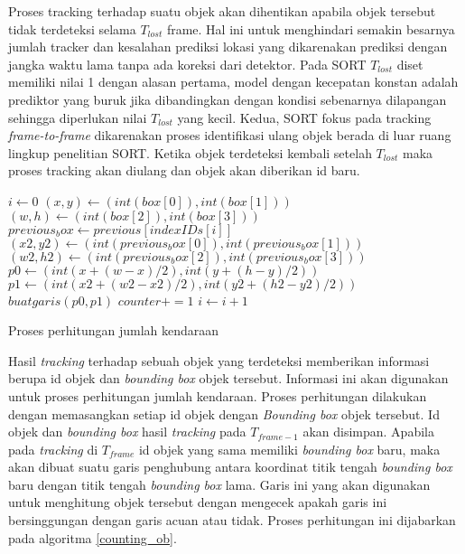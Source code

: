 \documentclass[../thesis.tex]{subfiles}
\begin{document}
Proses tracking terhadap suatu objek akan dihentikan apabila objek tersebut tidak terdeteksi selama $T_{lost}$ frame. Hal ini untuk menghindari semakin besarnya jumlah tracker dan kesalahan prediksi lokasi yang dikarenakan prediksi dengan jangka waktu lama tanpa ada koreksi dari detektor. Pada SORT $T_{lost}$ diset memiliki nilai 1 dengan alasan pertama, model dengan kecepatan konstan adalah prediktor yang buruk jika dibandingkan dengan kondisi sebenarnya dilapangan sehingga diperlukan nilai $T_{lost}$ yang kecil. Kedua, SORT fokus pada tracking \textit{frame-to-frame} dikarenakan proses identifikasi ulang objek berada 
di luar ruang lingkup penelitian SORT. Ketika objek terdeteksi kembali setelah $T_{lost}$ maka proses tracking akan diulang dan objek akan diberikan id baru.
\begin{algorithm}[htp]
	\begin{algorithmic}[1]
			\State $i \leftarrow 0$
				\State $(x, y) \leftarrow (int(box[0]), int(box[1]))$
				\State $(w, h) \leftarrow (int(box[2]), int(box[3]))$
					\State $previous_box \leftarrow previous[indexIDs[i]]$
					\State $(x2, y2) \leftarrow (int(previous_box[0]), int(previous_box[1]))$
					\State $(w2, h2) \leftarrow (int(previous_box[2]), int(previous_box[3]))$
					\State $p0 \leftarrow (int(x + (w-x)/2), int(y + (h-y)/2))$
					\State $p1 \leftarrow (int(x2 + (w2-x2)/2), int(y2 + (h2-y2)/2))$
					\State $buat garis (p0, p1)$
						\State $counter += 1$
					\EndIf
				\EndIf
				\State $i \leftarrow i+1$
			\EndFor
		\EndIf
	\end{algorithmic}
	\caption{Proses perhitungan jumlah kendaraan}
	\label{counting_ob}
\end{algorithm}

Hasil \textit{tracking} terhadap sebuah objek yang terdeteksi memberikan informasi berupa id objek dan \textit{bounding box} objek tersebut. Informasi ini akan digunakan untuk proses perhitungan jumlah kendaraan. Proses perhitungan dilakukan dengan memasangkan setiap id objek dengan \textit{Bounding box} objek tersebut. 
Id objek dan \textit{bounding box} hasil \textit{tracking} pada $T_{frame-1}$ akan disimpan. Apabila pada \textit{tracking} di $T_{frame}$ id objek yang sama memiliki \textit{bounding box} baru, maka akan dibuat suatu garis penghubung antara koordinat titik tengah \textit{bounding box} baru dengan titik tengah \textit{bounding box} lama. Garis ini
yang akan digunakan untuk menghitung objek tersebut dengan mengecek apakah garis ini bersinggungan dengan garis acuan atau tidak. Proses perhitungan ini dijabarkan pada algoritma \ref{counting_ob}.
\end{document}
